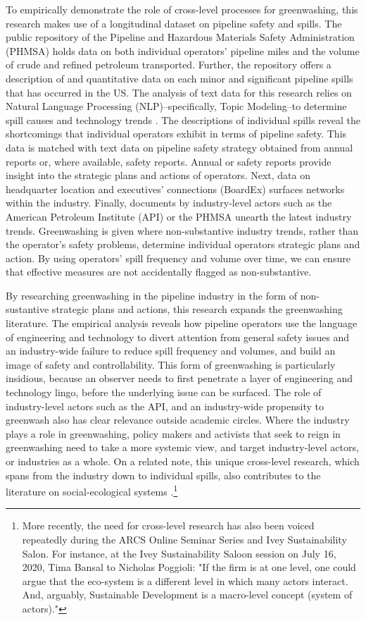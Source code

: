 To empirically demonstrate the role of cross-level processes for greenwashing, this research makes use of a longitudinal dataset on pipeline safety and spills. The public repository of the Pipeline and Hazardous Materials Safety Administration (PHMSA) holds data on both individual operators' pipeline miles and the volume of crude and refined petroleum transported. Further, the repository offers a description of and quantitative data on each minor and significant pipeline spills that has occurred in the US. The analysis of text data for this research relies on Natural Language Processing (NLP)--specifically, Topic Modeling--to determine spill causes and technology trends \citep{Hannigan2019}. The descriptions of individual spills reveal the shortcomings that individual operators exhibit in terms of pipeline safety. This data is matched with text data on pipeline safety strategy obtained from annual reports or, where available, safety reports. Annual or safety reports provide insight into the strategic plans and actions of operators. Next, data on headquarter location and executives' connections (BoardEx) surfaces networks within the industry. Finally, documents by industry-level actors such as the American Petroleum Institute (API) or the PHMSA unearth the latest industry trends. Greenwashing is given where non-substantive industry trends, rather than the operator's safety problems, determine individual operators strategic plans and action. By using operators' spill frequency and volume over time, we can ensure that effective measures are not accidentally flagged as non-substantive.

By researching greenwashing in the pipeline industry in the form of non-sustantive strategic plans and actions, this research expands the greenwashing literature. The empirical analysis reveals how pipeline operators use the language of engineering and technology to divert attention from general safety issues and an industry-wide failure to reduce spill frequency and volumes, and build an image of safety and controllability. This form of greenwashing is particularly insidious, because an observer needs to first penetrate a layer of engineering and technology lingo, before the underlying issue can be surfaced. The role of industry-level actors such as the API, and an industry-wide propensity to greenwash also has clear relevance outside academic circles. Where the industry plays a role in greenwashing, policy makers and activists that seek to reign in greenwashing need to take a more systemic view, and target industry-level actors, or industries as a whole. On a related note, this unique cross-level research, which spans from the industry down to individual spills, also contributes to the literature on social-ecological systems \citep{Reyers2018}.\footnote{More recently, the need for cross-level research has also been voiced repeatedly during the ARCS Online Seminar Series and Ivey Sustainability Salon. For instance, at the Ivey Sustainability Saloon session on July 16, 2020, Tima Bansal to Nicholas Poggioli: "If the firm is at one level, one could argue that the eco-system is a different level in which many actors interact. And, arguably, Sustainable Development is a macro-level concept (system of actors)."}

